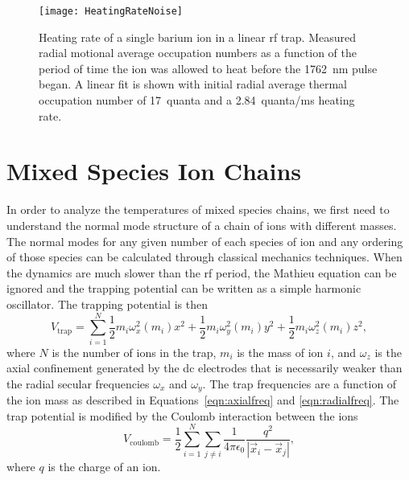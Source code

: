 \begin{figure}
	\centering
	\texttt{[image: HeatingRateNoise]}
	\caption[Heating rate of single barium ion]{Heating rate of a single barium ion in a linear rf trap.  Measured radial motional average occupation numbers as a function of the period of time the ion was allowed to heat before the 1762~nm pulse began.  A linear fit is shown with initial radial average thermal occupation number of 17~quanta and a 2.84~quanta/ms heating rate.}
	\label{fig:heating}
\end{figure}

\section{Mixed Species Ion Chains}
\label{sec:mixed-modes}

In order to analyze the temperatures of mixed species chains, we first need to understand the normal mode structure of a chain of ions with different masses.  The normal modes for any given number of each species of ion and any ordering of those species can be calculated through classical mechanics techniques.  When the dynamics are much slower than the rf period, the Mathieu equation can be ignored and the trapping potential can be written as a simple harmonic oscillator.  The trapping potential is then
\begin{equation}
	V_\mathrm{trap} = \sum\limits_{i=1}^N \frac{1}{2} m_i \omega_x^2(m_i) x^2 + \frac{1}{2} m_i \omega_y^2(m_i) y^2 + \frac{1}{2} m_i \omega_z^2(m_i) z^2 \mathrm{,}
\end{equation}
where $N$ is the number of ions in the trap, $m_i$ is the mass of ion $i$, and $\omega_z$ is the axial confinement generated by the dc electrodes that is necessarily weaker than the radial secular frequencies $\omega_x$ and $\omega_y$.  The trap frequencies are a function of the ion mass as described in Equations~\ref{eqn:axialfreq} and \ref{eqn:radialfreq}.  The trap potential is modified by the Coulomb interaction between the ions
\begin{equation}
	V_\mathrm{coulomb} = \frac{1}{2} \sum\limits_{i = 1}^N \sum\limits_{j \ne i} \frac{1}{4 \pi \epsilon_0} \frac{q^2}{ \left| \vec{x}_i - \vec{x}_j \right| } \mathrm{,}
\end{equation}
where $q$ is the charge of an ion.

